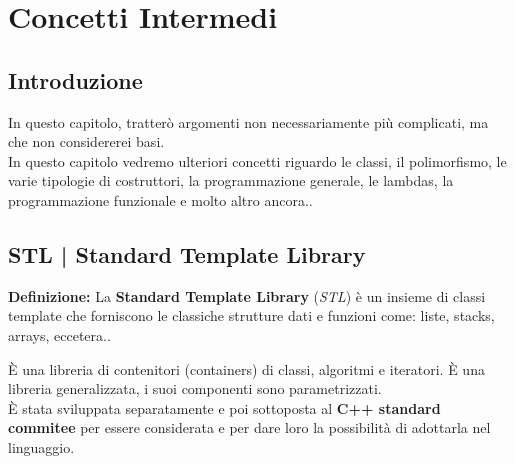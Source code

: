 
\chapter{Concetti Intermedi}





\section{Introduzione}

\textsf{\small In questo capitolo, tratterò argomenti non necessariamente più complicati, ma che non considererei basi. } \\

\textsf{\small In questo capitolo vedremo ulteriori concetti riguardo le classi, il polimorfismo, le varie tipologie di costruttori, la programmazione generale, le lambdas, la programmazione funzionale e molto altro ancora..} \break



\section{STL | Standard Template Library}

\textsf{\small \textbf{Definizione: } La \textbf{Standard Template Library} (\emph{STL}) è un insieme di classi template che forniscono le classiche strutture dati e funzioni come: liste, stacks, arrays, eccetera..} \break

\textsf{\small È una libreria di contenitori (containers) di classi, algoritmi e iteratori. È una libreria generalizzata, i suoi componenti sono parametrizzati.} \\

\textsf{\small È stata sviluppata separatamente e poi sottoposta al \textbf{C++ standard commitee} per essere considerata e per dare loro la possibilità di adottarla nel linguaggio.} \break

